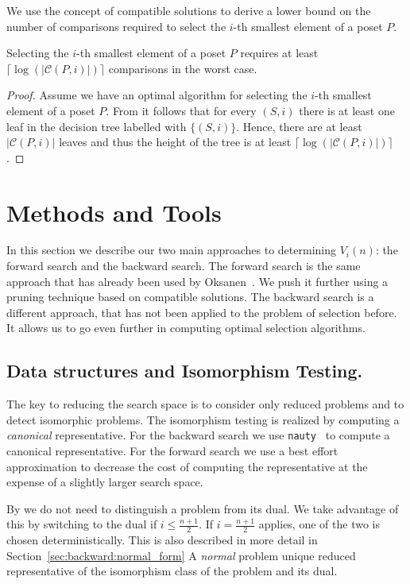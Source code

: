\documentclass[twoside,leqno,twocolumn]{article}
\begin{document}
We use the concept of compatible solutions to derive a lower bound on the number of comparisons required to select the $i$-th smallest element of a poset $P$.

\begin{theorem}\label{theorem:compatible_log}
  Selecting the $i$-th smallest element of a poset $P$ requires at least $\lceil\log(|\mathcal{C}(P, i)|)\rceil$ comparisons in the worst case.
\end{theorem}

\begin{proof}
  Assume we have an optimal algorithm for selecting the $i$-th smallest element of a poset $P$.
  From  it follows that for every $(S, i)$ there is at least one leaf in the decision tree labelled with $\{(S, i)\}$.
  Hence, there are at least $|\mathcal{C}(P, i)|$ leaves and thus the height of the tree is at least $\lceil\log(|\mathcal{C}(P, i)|)\rceil$.
\end{proof}


\section{Methods and Tools}

In this section we describe our two main approaches to determining $V_i(n)$: the forward search and the backward search.
The forward search is the same approach that has already been used by Oksanen~\cite{Oksanen2006}.
We push it further using a pruning technique based on compatible solutions.
The backward search is a different approach, that has not been applied to the problem of selection before.
It allows us to go even further in computing optimal selection algorithms.

\subsection{Data structures and Isomorphism Testing.}
The key to reducing the search space is to consider only reduced problems and to detect isomorphic problems.
The isomorphism testing is realized by computing a \emph{canonical} representative.
For the backward search we use \texttt{nauty}~\cite{MCKAY201494} to compute a canonical representative.
For the forward search we use a best effort approximation to decrease the cost of computing the representative at the expense of a slightly larger search space.

By  we do not need to distinguish a problem from its dual.
We take advantage of this by switching to the dual if $i\leq\frac{n+1}{2}$.
If $i = \frac{n+1}{2}$ applies, one of the two is chosen deterministically.
This is also described in more detail in Section~\ref{sec:backward:normal_form}
A \emph{normal} problem unique reduced representative of the isomorphism class of the problem and its dual.
\end{document}

